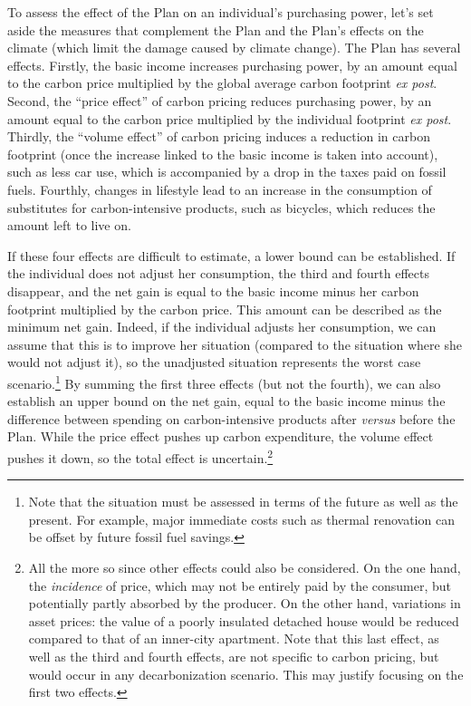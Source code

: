 \documentclass[a5paper,english,openany]{memoir}
\begin{document}
To assess the effect of the Plan on an individual's purchasing power, let's set aside the measures that complement the Plan and the Plan's effects on the climate (which limit the damage caused by climate change). The Plan has several effects. Firstly, the basic income increases purchasing power, by an amount equal to the carbon price multiplied by the global average carbon footprint \textit{ex post}. Second, the ``price effect'' of carbon pricing reduces purchasing power, by an amount equal to the carbon price multiplied by the individual footprint \textit{ex post}. Thirdly, the ``volume effect'' of carbon pricing induces a reduction in carbon footprint (once the increase linked to the basic income is taken into account), such as less car use, which is accompanied by a drop in the taxes paid on fossil fuels. Fourthly, changes in lifestyle lead to an increase in the consumption of substitutes for carbon-intensive products, such as bicycles, which reduces the amount left to live on. %

If these four effects are difficult to estimate, a lower bound can be established. If the individual does not adjust her consumption, the third and fourth effects disappear, and the net gain is equal to the basic income minus her carbon footprint multiplied by the carbon price. This amount can be described as the minimum net gain. Indeed, if the individual adjusts her consumption, we can assume that this is to improve her situation (compared to the situation where she would not adjust it), so the unadjusted situation represents the worst case scenario.\footnote{Note that the situation must be assessed in terms of the future as well as the present. For example, major immediate costs such as thermal renovation can be offset by future fossil fuel savings.} By summing the first three effects (but not the fourth), we can also establish an upper bound on the net gain, equal to the basic income minus the difference between spending on carbon-intensive products after \textit{versus} before the Plan. 
While the price effect pushes up carbon expenditure, the volume effect pushes it down, so the total effect is uncertain.\footnote{All the more so since other effects could also be considered. On the one hand, the \textit{incidence} of price, which may not be entirely paid by the consumer, but potentially partly absorbed by the producer. On the other hand, variations in asset prices: the value of a poorly insulated detached house would be reduced compared to that of an inner-city apartment. Note that this last effect, as well as the third and fourth effects, are not specific to carbon pricing, but would occur in any decarbonization scenario. This may justify focusing on the first two effects.} 
\end{document}
